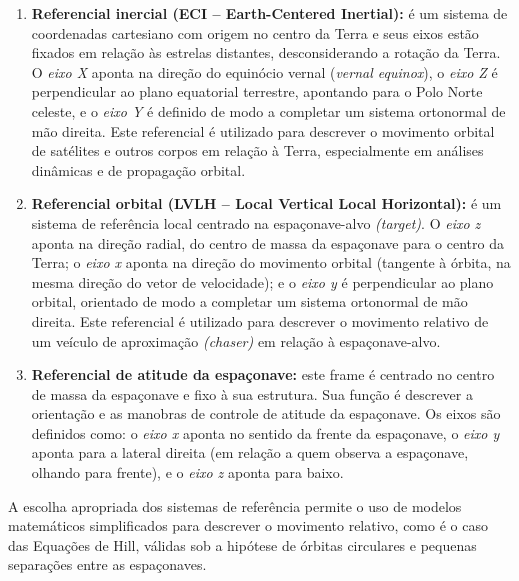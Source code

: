 \begin{enumerate}[label=(\alph*)]
    \item \textbf{Referencial inercial (ECI – Earth-Centered Inertial):} é um sistema de coordenadas cartesiano com origem no centro da Terra e seus eixos estão fixados em relação às estrelas distantes, desconsiderando a rotação da Terra. O \textit{eixo X} aponta na direção do equinócio vernal (\textit{vernal equinox}), o \textit{eixo Z} é perpendicular ao plano equatorial terrestre, apontando para o Polo Norte celeste, e o \textit{eixo Y} é definido de modo a completar um sistema ortonormal de mão direita. Este referencial é utilizado para descrever o movimento orbital de satélites e outros corpos em relação à Terra, especialmente em análises dinâmicas e de propagação orbital.
    
    \item \textbf{Referencial orbital (LVLH – Local Vertical Local Horizontal):} é um sistema de referência local centrado na espaçonave-alvo \textit{(target)}. O \textit{eixo z} aponta na direção radial, do centro de massa da espaçonave para o centro da Terra; o \textit{eixo x} aponta na direção do movimento orbital (tangente à órbita, na mesma direção do vetor de velocidade); e o \textit{eixo y} é perpendicular ao plano orbital, orientado de modo a completar um sistema ortonormal de mão direita. Este referencial é utilizado para descrever o movimento relativo de um veículo de aproximação \textit{(chaser)} em relação à espaçonave-alvo.
    
    \item \textbf{Referencial de atitude da espaçonave:} este frame é centrado no centro de massa da espaçonave e fixo à sua estrutura. Sua função é descrever a orientação e as manobras de controle de atitude da espaçonave. Os eixos são definidos como: o \textit{eixo x} aponta no sentido da frente da espaçonave, o \textit{eixo y} aponta para a lateral direita (em relação a quem observa a espaçonave, olhando para frente), e o \textit{eixo z} aponta para baixo.
\end{enumerate}

A escolha apropriada dos sistemas de referência permite o uso de modelos matemáticos simplificados para descrever o movimento relativo, como é o caso das Equações de Hill, válidas sob a hipótese de órbitas circulares e pequenas separações entre as espaçonaves.